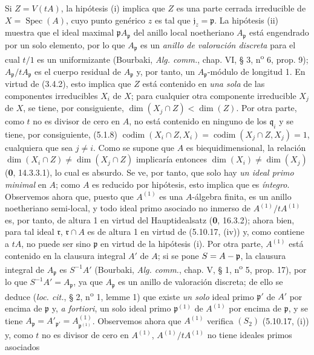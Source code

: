Si $Z=V(tA)$, la hipótesis (i) implica que $Z$ es una parte cerrada
irreducible de $X=\operatorname{Spec}(A)$, cuyo punto genérico $z$ es tal que
$\mathfrak j_z=\mathfrak p$. La hipótesis (ii) muestra que el ideal maximal
$\mathfrak pA_{\mathfrak p}$ del anillo local noetheriano $A_{\mathfrak p}$
está engendrado por un solo elemento, por lo que $A_{\mathfrak p}$ es un
\emph{anillo de valoración discreta} para el cual $t/1$ es un uniformizante (Bourbaki,
\emph{Alg. comm.}, chap. VI, § 3, n\textsuperscript{o} 6, prop. 9);
$A_{\mathfrak p}/tA_{\mathfrak p}$ es el cuerpo residual de
$A_{\mathfrak p}$ y, por tanto, un $A_{\mathfrak p}$-módulo de longitud 1. En
virtud de (3.4.2), esto implica que $Z$ está contenido en \emph{una sola} de las
componentes irreducibles $X_i$ de $X$; para cualquier otra componente
irreducible $X_j$ de $X$, se tiene, por consiguiente,
$\dim(X_j\cap Z)<\dim(Z)$. Por otra parte, como $t$ no es divisor de cero en
$A$, no está contenido en ninguno de los $\mathfrak q_i$ y se tiene, por
consiguiente, (5.1.8)
$\operatorname{codim}(X_i\cap Z,X_i)
=\operatorname{codim}(X_j\cap Z,X_j)=1$,
cualquiera que sea $j\neq i$. Como se supone que $A$ es biequidimensional, la
relación $\dim(X_i\cap Z)\neq\dim(X_j\cap Z)$ implicaría entonces
$\dim(X_i)\neq\dim(X_j)$ (\textbf 0, 14.3.3.1), lo cual es absurdo. Se ve, por tanto,
que solo hay \emph{un ideal primo minimal} en $A$; como $A$ es reducido por hipótesis,
esto implica que es \emph{íntegro}. Observemos ahora que, puesto que $A^{(1)}$ es una
$A$-álgebra finita, es un anillo noetheriano semi-local, y todo ideal primo
asociado no inmerso de $A^{(1)}/tA^{(1)}$ es, por tanto, de altura 1 en virtud
del Hauptidealsatz (\textbf 0, 16.3.2); ahora bien, para tal ideal $\mathfrak r$,
$\mathfrak r\cap A$ es de altura 1 en virtud de (5.10.17, (iv)) y, como
contiene a $tA$, no puede ser sino $\mathfrak p$ en virtud de la hipótesis (i).
Por otra parte, $A^{(1)}$ está contenido en la clausura integral $A'$ de $A$;
si se pone $S=A-\mathfrak p$, la clausura integral de $A_{\mathfrak p}$ es
$S^{-1}A'$ (Bourbaki, \emph{Alg. comm.}, chap. V, § 1,
n\textsuperscript{o} 5, prop. 17), por lo que $S^{-1}A'=A_{\mathfrak p}$, ya
que $A_{\mathfrak p}$ es un anillo de valoración discreta; de ello se deduce
(\emph{loc. cit.}, § 2, n\textsuperscript{o} 1, lemme 1) que existe \emph{un solo}
ideal primo $\mathfrak p'$ de $A'$ por encima de $\mathfrak p$ y, \emph{a fortiori},
un solo ideal primo $\mathfrak p^{(1)}$ de $A^{(1)}$ por encima de
$\mathfrak p$, y se tiene
$A_{\mathfrak p}=A'_{\mathfrak p'}
=A^{(1)}_{\mathfrak p^{(1)}}$.
Observemos ahora que $A^{(1)}$ verifica $(S_2)$ (5.10.17, (i)) y, como $t$ no
es divisor de cero en $A^{(1)}$, $A^{(1)}/tA^{(1)}$ no tiene ideales primos
asociados

